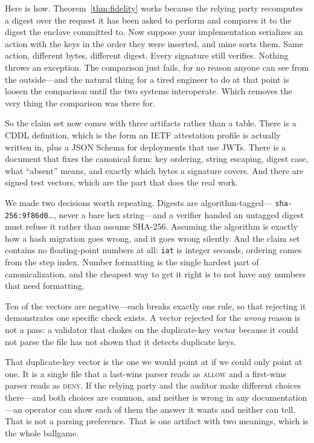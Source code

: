 \documentclass[11pt]{article}
\newcommand{\iat}{\texttt{iat}}
\begin{document}
Here is how. Theorem~\ref{thm:fidelity} works because the relying party
recomputes a digest over the request it has been asked to perform and compares
it to the digest the enclave committed to. Now suppose your implementation
serializes an action with the keys in the order they were inserted, and mine
sorts them. Same action, different bytes, different digest. Every signature
still verifies. Nothing throws an exception. The comparison just fails, for no
reason anyone can see from the outside---and the natural thing for a tired
engineer to do at that point is loosen the comparison until the two systems
interoperate. Which removes the very thing the comparison was there for.

So the claim set now comes with three artifacts rather than a table. There is a
CDDL definition, which is the form an IETF attestation profile is actually
written in, plus a JSON Schema for deployments that use JWTs. There is a
document that fixes the canonical form: key ordering, string escaping, digest
case, what ``absent'' means, and exactly which bytes a signature covers. And
there are signed test vectors, which are the part that does the real work.

We made two decisions worth repeating. Digests are algorithm-tagged---
\texttt{sha-256:9f86d0}\ldots, never a bare hex string---and a verifier handed
an untagged digest must refuse it rather than assume SHA-256. Assuming the
algorithm is exactly how a hash migration goes wrong, and it goes wrong
silently. And the claim set contains no floating-point numbers at all: \iat{}
is integer seconds, ordering comes from the step index. Number formatting is
the single hardest part of canonicalization, and the cheapest way to get it
right is to not have any numbers that need formatting.

Ten of the vectors are negative---each breaks exactly one rule, so that
rejecting it demonstrates one specific check exists. A vector rejected for the
\emph{wrong} reason is not a pass: a validator that chokes on the duplicate-key
vector because it could not parse the file has not shown that it detects
duplicate keys.

That duplicate-key vector is the one we would point at if we could only point
at one. It is a single file that a last-wins parser reads as \textsc{allow} and
a first-wins parser reads as \textsc{deny}. If the relying party and the
auditor make different choices there---and both choices are common, and neither
is wrong in any documentation---an operator can show each of them the answer it
wants and neither can tell. That is not a parsing preference. That is one
artifact with two meanings, which is the whole ballgame.
\end{document}
